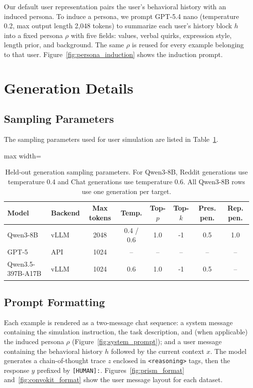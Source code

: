 \documentclass{article} %
\begin{document}
Our default user representation pairs the user's behavioral history with an induced persona. To induce a persona, we prompt GPT-5.4 nano (temperature 0.2, max output length 2{,}048 tokens) to summarize each user's history block $h$ into a fixed persona $\rho$ with five fields: values, verbal quirks, expression style, length prior, and background. The same $\rho$ is reused for every example belonging to that user. Figure~\ref{fig:persona_induction} shows the induction prompt.



\section{Generation Details}\label{sec:sampling_params}
\subsection{Sampling Parameters}
The sampling parameters used for user simulation are listed in Table~\ref{tab:heldout_generation_params}.

\begin{table}[h]
\centering
\small
\setlength{\tabcolsep}{3.2pt}
\begin{adjustbox}{max width=\linewidth}
\begin{tabular}{@{}llcccccc@{}}
\toprule
Model & Backend & Max tokens & Temp. & Top-$p$ & Top-$k$ & Pres. pen. & Rep. pen. \\
\midrule
Qwen3-8B & vLLM & 2048 & 0.4 / 0.6 & 1.0 & -1 & 0.5 & 1.0 \\
GPT-5 & API & 1024 & -- & -- & -- & -- & -- \\
Qwen3.5-397B-A17B & vLLM & 1024 & 0.6 & 1.0 & -1 & 0.5 & -- \\
\bottomrule
\end{tabular}
\end{adjustbox}
\caption{Held-out generation sampling parameters. For Qwen3-8B, Reddit generations use temperature 0.4 and Chat generations use temperature 0.6. All Qwen3-8B rows use one generation per target.}
\label{tab:heldout_generation_params}
\end{table}

\subsection{Prompt Formatting}
Each example is rendered as a two-message chat sequence: a system message containing the simulation instruction, the task description, and (when applicable) the induced persona $\rho$ (Figure~\ref{fig:system_prompt}); and a user message containing the behavioral history $h$ followed by the current context $x$. The model generates a chain-of-thought trace $z$ enclosed in \texttt{<reasoning>} tags, then the response $y$ prefixed by \texttt{[HUMAN]:}. Figures~\ref{fig:prism_format} and~\ref{fig:convokit_format} show the user message layout for each dataset.

\end{document}
